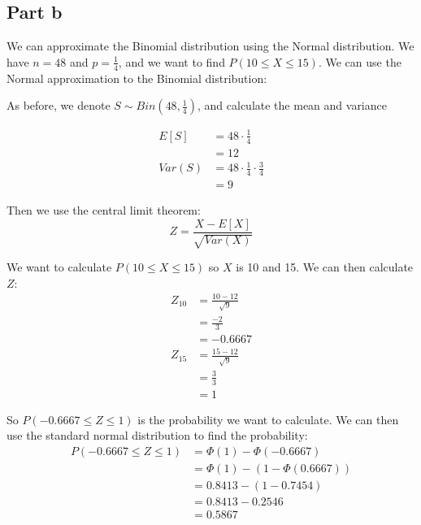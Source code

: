 \subsection{Part b}

We can approximate the Binomial distribution using the Normal distribution. We have $n = 48$ and $p = \frac{1}{4}$, and we want to find $P(10 \leq X \leq 15)$. We can use the Normal approximation to the Binomial distribution:

As before, we denote $S\sim Bin(48, \frac{1}{4})$, and calculate the mean and variance

\begin{align*}
	E[S]   & = 48 \cdot \frac{1}{4}                   \\
	       & = 12                                     \\
	Var(S) & = 48 \cdot \frac{1}{4} \cdot \frac{3}{4} \\
	       & = 9
\end{align*}

Then we use the central limit theorem:
\[
	Z = \frac{X - E[X]}{\sqrt{Var(X)}}
\]

We want to calculate $P(10\leq X\leq 15)$ so $X$ is 10 and 15. We can then calculate $Z$:
\begin{align*}
	Z_{10} & = \frac{10 - 12}{\sqrt{9}} \\
	       & = \frac{-2}{3}             \\
	       & = -0.6667                  \\
	Z_{15} & = \frac{15 - 12}{\sqrt{9}} \\
	       & = \frac{3}{3}              \\
	       & = 1
\end{align*}

So $P(-0.6667 \leq Z \leq 1)$ is the probability we want to calculate. We can then use the standard normal distribution to find the probability:
\begin{align*}
	P(-0.6667 \leq Z \leq 1) & = \Phi(1) - \Phi(-0.6667)      \\
	                         & = \Phi(1) - (1 - \Phi(0.6667)) \\
	                         & = 0.8413 - (1-0.7454)          \\
	                         & = 0.8413 - 0.2546              \\
	                         & = 0.5867
\end{align*}
